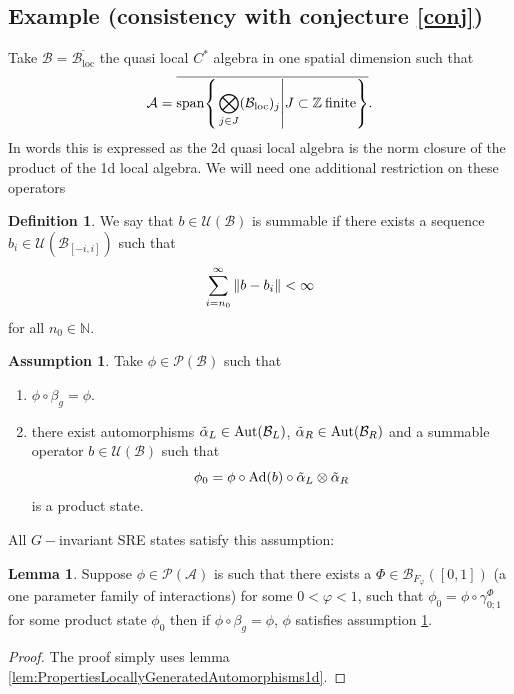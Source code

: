 \documentclass[12pt,a4paper,twoside]{article}
\let\originalleft\left
\let\originalright\right
\renewcommand{\left}{\mathopen{}\mathclose\bgroup\originalleft}
\renewcommand{\right}{\aftergroup\egroup\originalright}
\newcommand{\UU}{\mathcal U}
\newcommand{\BB}{\mathcal B}
\newcommand{\PP}{\mathcal P}
\newcommand{\ZZ}{\mathbb Z}
\renewcommand{\AA}{\mathcal A}
\newcommand{\NN}{\mathbb{N}}
\newcommand{\Ad}[1]{\textrm{Ad}\left(#1\right)}
\newcommand{\Aut}[1]{\textrm{Aut}\left(#1\right)}
\theoremstyle{definition}
\newtheorem{definition}[theorem]{Definition}
\newtheorem{lemma}[theorem]{Lemma}
\newtheorem{assumption}[theorem]{Assumption}
\numberwithin{equation}{section}
\begin{document}
\subsection{Example (consistency with conjecture \ref{conj})}\label{sec:OneTranslationDirectionExample}
Take $\BB=\overline{\BB_{\text{loc}}}$ the quasi local $C^*$ algebra in one spatial dimension such that
\begin{equation}
	\AA=\overline{\textrm{span}\left\{\left.\bigotimes_{j\in J}(\BB_{\text{loc}})_j\right|J\subset \ZZ\:\text{finite}\right\}}.
\end{equation}
In words this is expressed as the 2d quasi local algebra is the norm closure of the product of the 1d local algebra. We will need one additional restriction on these operators
\begin{definition}\label{def:SummableOperator}
	We say that $b\in\UU(\BB)$ is summable if there exists a sequence $b_i\in \UU(\BB_{[-i,i]})$ such that
	\begin{equation}
		\sum_{i=n_0}^{\infty}\norm{b-b_i}<\infty
	\end{equation}
	for all $n_0\in\NN$.
\end{definition}
\begin{assumption}\label{assumption1d}
	Take $\phi\in\PP(\BB)$ such that
	\begin{enumerate}
		\item $\phi\circ\beta_g=\phi$.
		\item there exist automorphisms $\tilde\alpha_L\in\Aut{\BB_L}$, $\tilde\alpha_R\in\Aut{\BB_R}$ and a summable operator $b\in\UU(\BB)$ such that
		\begin{equation}
			\phi_0=\phi\circ\Ad{b}\circ\tilde\alpha_L\otimes\tilde\alpha_R
		\end{equation}
		is a product state.
	\end{enumerate}
\end{assumption}
All $G-$invariant SRE states satisfy this assumption:
\begin{lemma}\label{lem:SRE_Implies_Assumption_1d}
	Suppose $\phi\in\PP(\AA)$ is such that there exists a $\Phi\in \BB_{F_\varphi}([0,1])$ (a one parameter family of interactions) for some $0<\varphi<1$, such that $\phi_0=\phi\circ\gamma^\Phi_{0;1}$ for some product state $\phi_0$ then if $\phi\circ\beta_g=\phi$, $\phi$ satisfies assumption \ref{assumption1d}.
\end{lemma}
\begin{proof}
	The proof simply uses lemma \ref{lem:PropertiesLocallyGeneratedAutomorphisms1d}.
\end{proof}
\end{document}
